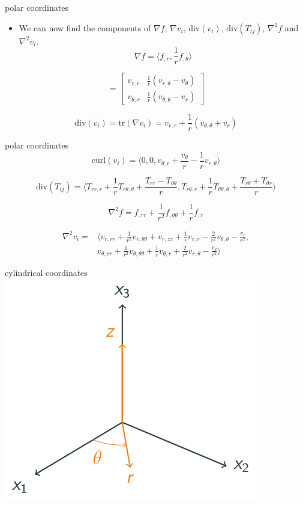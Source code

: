 \begin{frame}{polar coordinates}
\protect\hypertarget{polar-coordinates-2}{}
\begin{itemize}
\tightlist
\item
  We can now find the components of \(\nabla f\), \(\nabla v_i\),
  \(\text{div} (v_i)\), \(\text{div} (T_{ij})\), \(\nabla^2f\) and
  \(\nabla^2 v_i\).
  \[\nabla f = \langle f_{,r}, \frac{1}{r}f_{,\theta} \rangle\]
\end{itemize}

\[= \begin{bmatrix}
    v_{r,r} & \frac{1}{r}(v_{r,\theta}-v_\theta)\\
    v_{\theta,r} & \frac{1}{r}(v_{\theta,\theta}-v_r)
\end{bmatrix}\]

\[\text{div} (v_i) = \text{tr} (\nabla v_i) = v_{r,r} +\frac{1}{r}(v_{\theta,\theta}+v_r)\]
\end{frame}

\begin{frame}{polar coordinates}
\protect\hypertarget{polar-coordinates-3}{}
\[\text{curl} (v_i) = \langle 0, 0, v_{\theta,r} + \frac{v_\theta}{r} - \frac{1}{r}v_{r,\theta} \rangle\]

\[\text{div} (T_{ij}) = \langle T_{rr,r} + \frac{1}{r}T_{r\theta,\theta} + \frac{T_{rr}-T_{\theta\theta}}{r}, T_{r\theta,r} + \frac{1}{r} T_{\theta\theta,\theta} + \frac{T_{r\theta} + T_{\theta r}}{r} \rangle\]

\[\nabla^2 f = f_{,rr} + \frac{1}{r^2} f_{,\theta\theta} + \frac{1}{r}f_{,r}\]

\[\begin{aligned}
    \nabla^2 v_i =& \langle v_{r,rr} + \frac{1}{r^2}v_{r,\theta\theta} + v_{r,zz} + \frac{1}{r}v_{r,r} - \frac{2}{r^2}v_{\theta,\theta}-\frac{v_r}{r^2},\\
    & v_{\theta,rr} + \frac{1}{r^2}v_{\theta,\theta\theta} + \frac{1}{r}v_{\theta,r} + \frac{2}{r^2}v_{r,\theta}- \frac{v_\theta}{r^2}\rangle
\end{aligned}\]
\end{frame}

\begin{frame}{cylindrical coordinates}
\protect\hypertarget{cylindrical-coordinates}{}
\includegraphics{../images/cylindrical.svg}
\end{frame}

